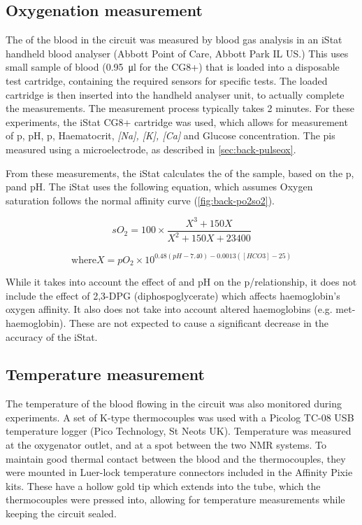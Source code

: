 \subsection{Oxygenation measurement}
The \SOtwo of the blood in the circuit was measured by blood gas analysis in an iStat handheld blood analyser (Abbott Point of Care, Abbott Park IL US.)
This uses small sample of blood (\SI{0.95}{\micro\litre} for the CG8+) that is loaded into a disposable test cartridge, containing the required sensors for specific tests.
The loaded cartridge is then inserted into the handheld analyser unit, to actually complete the measurements.
The measurement process typically takes 2 minutes.
For these experiments, the iStat CG8+ cartridge was used, which allows for measurement of p\Otwo, pH, p\COtwo, Haematocrit, \textit{[Na], [K], [Ca]} and Glucose concentration.
The p\Otwo is measured using a microelectrode, as described in \autoref{sec:back-pulseox}.

From these measurements, the iStat calculates the \SOtwo of the sample, based on the p\Otwo, p\COtwo and pH\cite{AbbottPointofCareCartridgeTestInformation2013}.
The iStat uses the following equation, which assumes Oxygen saturation follows the normal affinity curve (\autoref{fig:back-po2so2}).

\begin{displaymath}
\mathit{sO_2} = 100 \times \frac{X^3 + 150X}{X^2 + 150X + 23400}
\end{displaymath}

\begin{displaymath}
\mathrm{where } X = \mathit{pO_2} \times 10^{0.48(\mathit{pH}-7.40) - 0.0013(\mathit{[HCO3]}-25)}
\end{displaymath}

While it takes into account the effect of \COtwo and pH on the p\Otwo/\SOtwo relationship, it does not include the effect of 2,3-DPG (diphospoglycerate) which affects haemoglobin's oxygen affinity.
It also does not take into account altered haemoglobins (e.g. met-haemoglobin).
These are not expected to cause a significant decrease in the accuracy of the iStat.

\subsection{Temperature measurement}
The temperature of the blood flowing in the circuit was also monitored during experiments.
A set of K-type thermocouples was used with a Picolog TC-08 USB temperature logger (Pico Technology, St Neots UK).
Temperature was measured at the oxygenator outlet, and at a spot between the two NMR systems.
To maintain good thermal contact between the blood and the thermocouples, they were mounted in Luer-lock temperature connectors included in the Affinity Pixie kits.
These have a hollow gold tip which extends into the tube, which the thermocouples were pressed into, allowing for temperature measurements while keeping the circuit sealed.

